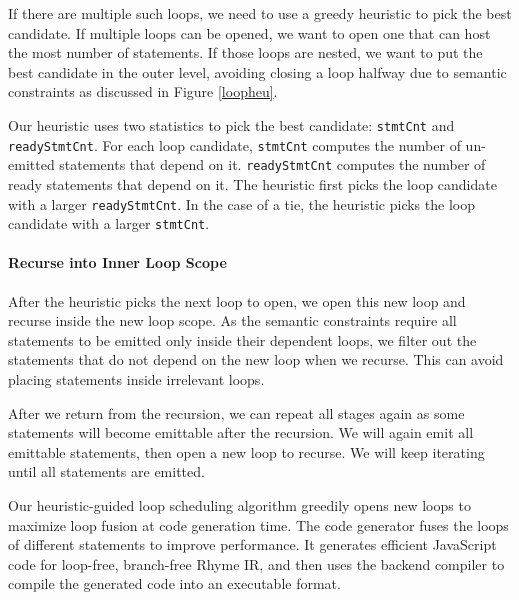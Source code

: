 \documentclass[sigplan, nonacm]{acmart}\settopmatter{printfolios=true,printccs=false,printacmref=false}
\begin{document}
If there are multiple such loops, we need to use a greedy heuristic to pick the best candidate. If multiple loops can be opened, we want to open one that can host the most number of statements. If those loops are nested, we want to put the best candidate in the outer level, avoiding closing a loop halfway due to semantic constraints as discussed in Figure \ref{loopheu}.\par

Our heuristic uses two statistics to pick the best candidate: \texttt{stmtCnt} and \texttt{readyStmtCnt}. For each loop candidate, \texttt{stmtCnt} computes the number of un-emitted statements that depend on it. \texttt{readyStmtCnt} computes the number of ready statements that depend on it. The heuristic first picks the loop candidate with a larger \texttt{readyStmtCnt}. In the case of a tie, the heuristic picks the loop candidate with a larger \texttt{stmtCnt}.\par

\paragraph*{Recurse into Inner Loop Scope} After the heuristic picks the next loop to open, we open this new loop and recurse inside the new loop scope. As the semantic constraints require all statements to be emitted only inside their dependent loops, we filter out the statements that do not depend on the new loop when we recurse. This can avoid placing statements inside irrelevant loops.\par

After we return from the recursion, we can repeat all stages again as some statements will become emittable after the recursion. We will again emit all emittable statements, then open a new loop to recurse. We will keep iterating until all statements are emitted.\par

Our heuristic-guided loop scheduling algorithm greedily opens new loops to maximize loop fusion at code generation time. The code generator fuses the loops of different statements to improve performance. It generates efficient JavaScript code for loop-free, branch-free Rhyme IR, and then uses the backend compiler to compile the generated code into an executable format.
\end{document}
